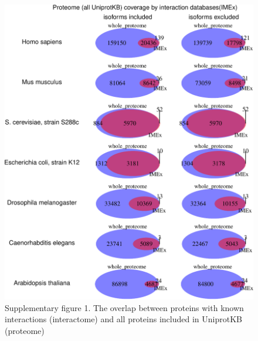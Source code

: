 \documentclass[]{article}
\begin{document}
\begin{figure}[htbp]
\centering
\includegraphics{final_report_files/figure-latex/Supplementary1_IMEx_vs_Uniprot_venndiagram_all_Uniprot-1.pdf}
\caption{Supplementary figure 1. The overlap between proteins with known
interactions (interactome) and all proteins included in UniprotKB
(proteome)}
\end{figure}
\end{document}
